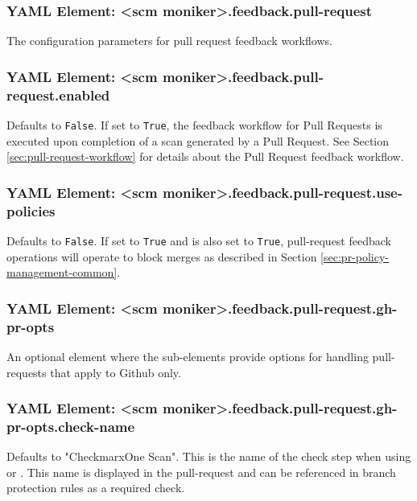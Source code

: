 \subsubsection{YAML Element: <scm moniker>.feedback.pull-request}\label{sec:yaml-feedback-pull-request}
The configuration parameters for pull request feedback workflows.

\subsubsection{YAML Element: <scm moniker>.feedback.pull-request.enabled}\label{sec:yaml-pull-request-enabled}
Defaults to \texttt{False}.  If set to \texttt{True}, the feedback workflow for Pull Requests is executed upon completion of a scan generated by
a Pull Request. See Section \ref{sec:pull-request-workflow} for details about the Pull Request feedback workflow.


\subsubsection{YAML Element: <scm moniker>.feedback.pull-request.use-policies}\label{sec:yaml-pull-request-use-policies}
Defaults to \texttt{False}.  If set to \texttt{True} and 
 is also set to \texttt{True},
pull-request feedback operations will operate to block merges as described in Section \ref{sec:pr-policy-management-common}.

\subsubsection{YAML Element: <scm moniker>.feedback.pull-request.gh-pr-opts}\label{sec:yaml-pull-request-gh-pr-opts}
An optional element where the sub-elements provide options for handling pull-requests that apply to Github only.

\subsubsection{YAML Element: <scm moniker>.feedback.pull-request.gh-pr-opts.check-name}\label{sec:yaml-pull-request-gh-pr-opts-check-name}
Defaults to "CheckmarxOne Scan".  This is the name of the check step when using 
or
.
This name is displayed in the pull-request and can be referenced in branch protection rules as a required check.


